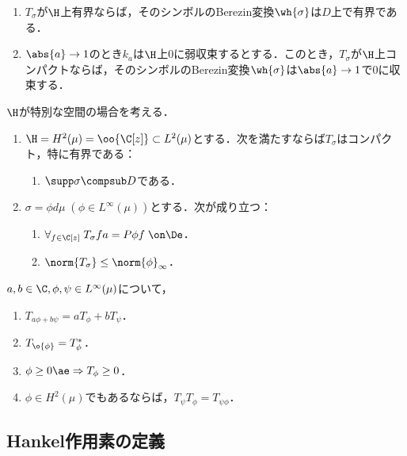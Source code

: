 \documentclass[uplatex,dvipdfmx]{jsreport}
\begin{document}
\begin{lemma}\mbox{}
    \begin{enumerate}
        \item $T_\sigma$が$\H$上有界ならば，そのシンボルのBerezin変換$\wh{\sigma}$は$D$上で有界である．
        \item $\abs{a}\to1$のとき$k_a$は$\H$上$0$に弱収束するとする．このとき，$T_\sigma$が$\H$上コンパクトならば，そのシンボルのBerezin変換$\wh{\sigma}$は$\abs{a}\to1$で$0$に収束する．
    \end{enumerate}
\end{lemma}

\begin{theorem}
    $\H$が特別な空間の場合を考える．
    \begin{enumerate}
        \item $\H=H^2(\mu)=\oo{\C[z]}\subset L^2(\mu)$とする．次を満たすならば$T_\sigma$はコンパクト，特に有界である：
        \begin{enumerate}
            \item $\supp\sigma\compsub D$である．
        \end{enumerate}
        \item $\sigma=\phi d\mu\;(\phi\in L^\infty(\mu))$とする．次が成り立つ：
        \begin{enumerate}
            \item $\forall_{f\in\C[z]}\;T_\sigma fa=P\phi f\;\on\De$．
            \item $\norm{T_\sigma}\le\norm{\phi}_\infty$．
        \end{enumerate}
    \end{enumerate}
\end{theorem}

\begin{proposition}
    $a,b\in\C,\phi,\psi\in L^\infty(\mu)$について，
    \begin{enumerate}
        \item $T_{a\phi +b\psi}=aT_\phi+bT_\psi$．
        \item $T_{\o{\phi}}=T^*_\phi$．
        \item $\phi\ge0\ae\Rightarrow T_\phi\ge0$．
        \item $\phi\in H^2(\mu)$でもあるならば，$T_\psi T_\phi=T_{\psi\phi}$．
    \end{enumerate}
\end{proposition}

\subsection{Hankel作用素の定義}
\end{document}
